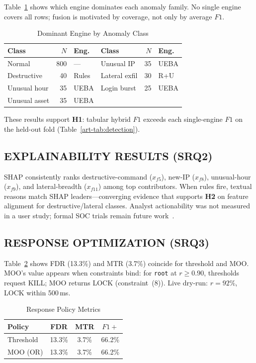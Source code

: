 Table~\ref{art-tab:per-class} shows which engine dominates each anomaly family. No single engine covers all rows; fusion is motivated by coverage, not only by average $F1$.

\begin{table}[H]
\caption{Dominant Engine by Anomaly Class}
\label{art-tab:per-class}
\centering
\scriptsize
\begin{tabular}{@{}lrl|lrl@{}}
\toprule
\textbf{Class} & $N$ & \textbf{Eng.} & \textbf{Class} & $N$ & \textbf{Eng.} \\
\midrule
Normal & 800 & --- & Unusual IP & 35 & UEBA \\
Destructive & 40 & Rules & Lateral exfil & 30 & R+U \\
Unusual hour & 35 & UEBA & Login burst & 25 & UEBA \\
Unusual asset & 35 & UEBA & & & \\
\bottomrule
\end{tabular}
\end{table}

These results support \textbf{H1}: tabular hybrid $F1$ exceeds each single-engine $F1$ on the held-out fold (Table~\ref{art-tab:detection}).

\subsection{EXPLAINABILITY RESULTS (SRQ2)}
SHAP consistently ranks destructive-command ($x_{f5}$), new-IP ($x_{f8}$), unusual-hour ($x_{f9}$), and lateral-breadth ($x_{f11}$) among top contributors. When rules fire, textual reasons match SHAP leaders---converging evidence that supports \textbf{H2} on feature alignment for destructive/lateral classes. Analyst actionability was not measured in a user study; formal SOC trials remain future work~\cite{ref25}.

\subsection{RESPONSE OPTIMIZATION (SRQ3)}
Table~\ref{art-tab:policy} shows FDR (13.3\%) and MTR (3.7\%) coincide for threshold and MOO. MOO's value appears when constraints bind: for \texttt{root} at $r\geq 0.90$, thresholds request KILL; MOO returns LOCK (constraint~(8)). Live dry-run: $r=92\%$, LOCK within 500\,ms.

\begin{table}[H]
\caption{Response Policy Metrics}
\label{art-tab:policy}
\centering
\scriptsize
\begin{tabular}{@{}lccc@{}}
\toprule
\textbf{Policy} & \textbf{FDR} & \textbf{MTR} & \textbf{$F1+$} \\
\midrule
Threshold & 13.3\% & 3.7\% & 66.2\% \\
MOO (OR) & 13.3\% & 3.7\% & 66.2\% \\
\bottomrule
\end{tabular}
\end{table}

